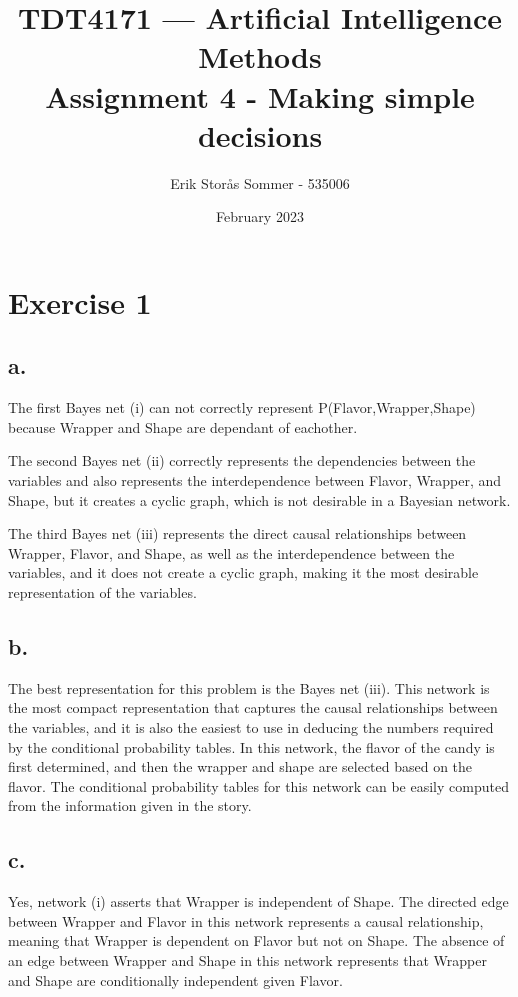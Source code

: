 \documentclass{article}
\title{TDT4171 — Artificial Intelligence Methods \\ Assignment 4 - Making simple decisions}
\author{Erik Storås Sommer - 535006}
\date{February 2023}
\begin{document}
\maketitle

\section*{Exercise 1}

\subsection*{a.}

The first Bayes net (i) can not correctly represent P(Flavor,Wrapper,Shape) because Wrapper and Shape are dependant of eachother.

The second Bayes net (ii) correctly represents the dependencies between the variables and also represents the interdependence between Flavor, Wrapper, and Shape, but it creates a cyclic graph, which is not desirable in a Bayesian network.

The third Bayes net (iii) represents the direct causal relationships between Wrapper, Flavor, and Shape, as well as the interdependence between the variables, and it does not create a cyclic graph, making it the most desirable representation of the variables.

\subsection*{b.}

The best representation for this problem is the Bayes net (iii). This network is the most compact representation that captures the causal relationships between the variables, and it is also the easiest to use in deducing the numbers required by the conditional probability tables. In this network, the flavor of the candy is first determined, and then the wrapper and shape are selected based on the flavor. The conditional probability tables for this network can be easily computed from the information given in the story.


\subsection*{c.}

Yes, network (i) asserts that Wrapper is independent of Shape. The directed edge between Wrapper and Flavor in this network represents a causal relationship, meaning that Wrapper is dependent on Flavor but not on Shape. The absence of an edge between Wrapper and Shape in this network represents that Wrapper and Shape are conditionally independent given Flavor.
\end{document}
